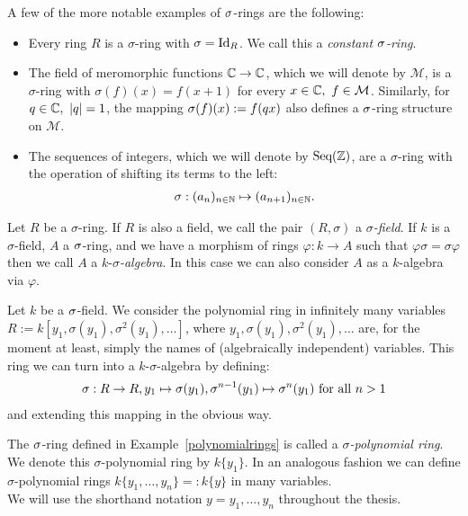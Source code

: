 \begin{ex} A few of the more notable examples of $\sigma$-rings are the following:

\begin{itemize}
\item Every ring $R$ is a $\sigma$-ring with $\sigma = \text{Id}_R$. We call this a \emph{constant $\sigma$-ring}.  
\item The field of meromorphic functions $\mathbb{C} \rightarrow \mathbb{C}$, which we will denote by $\mathcal{M}$,
is a $\sigma$-ring with $\sigma(f)(x) = f(x+1)$ for every $x \in \mathbb{C}, ~ f \in \mathcal{M}$.
Similarly, for $q \in \mathbb{C}, ~ |q| = 1$, the mapping $\sigma(f)(x) := f(qx)$ also defines a $\sigma$-ring structure on $\mathcal{M}$.
\item The sequences of integers, which we will denote by $\text{Seq}(\mathbb{Z})$, are a $\sigma$-ring with the operation of shifting its terms to the left:
\begin{align*} \sigma: (a_n)_{n \in \mathbb{N}} \mapsto (a_{n+1})_{n \in \mathbb{N}}. \end{align*}
\end{itemize}
\end{ex}

\begin{defn}
Let $R$ be a $\sigma$-ring. If $R$ is also a field, we call the pair $(R,\sigma)$ a $\sigma$\emph{-field}.  
If $k$ is a $\sigma$-field, $A$ a $\sigma$-ring, and we have a morphism of rings $\varphi \colon k \rightarrow A$ such that $\varphi \sigma = \sigma \varphi$
 then we call $A$ a $k$-$\sigma$\emph{-algebra}.  In this case we can also consider $A$ as a $k$-algebra via $\varphi$.
\end{defn}

\begin{ex}\label{polynomialrings}
Let $k$ be a $\sigma$-field. We consider the polynomial ring in infinitely many variables $R:= k[y_1,\sigma(y_1),\sigma^2(y_1),\ldots]$,
 where $y_1,\sigma(y_1),\sigma^2(y_1),\ldots$ are, for the moment at least, simply the names of (algebraically independent) variables.
This ring we can turn into a $k$-$\sigma$-algebra by defining:
\begin{align*} 
\sigma:  R \rightarrow R, y_1 \mapsto \sigma(y_1), \sigma^{n-1}(y_1) \mapsto \sigma^{n}(y_1) \text{ for all } n > 1 
\end{align*}
and extending this mapping in the obvious way. 
\end{ex}

\begin{defn}
The $\sigma$-ring defined in Example~\ref{polynomialrings}  is called a $\sigma$\emph{-polynomial ring}. 
We denote this $\sigma$-polynomial ring by $k\{y_1\}$. In an analogous fashion we can define $\sigma$-polynomial rings $k\{y_1, \ldots, y_n \} =: k\{y\}$ in many variables. \\
We will use the shorthand notation $y = y_1,\ldots,y_n$ throughout the thesis.
\end{defn}

